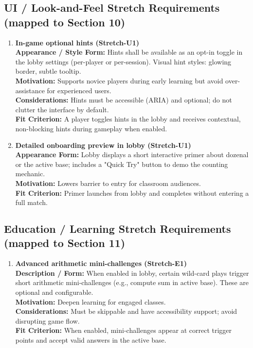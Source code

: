 \documentclass[12pt]{article}
\begin{document}
\subsection{UI / Look-and-Feel Stretch Requirements (mapped to Section 10)}
\begin{enumerate}
  \item \textbf{In-game optional hints (Stretch-U1)}\\
  \textbf{Appearance / Style Form:} Hints shall be available as an opt-in toggle in the lobby settings (per-player or per-session). Visual hint styles: glowing border, subtle tooltip.\\
  \textbf{Motivation:} Supports novice players during early learning but avoid over-assistance for experienced users.\\
  \textbf{Considerations:} Hints must be accessible (ARIA) and optional; do not clutter the interface by default.\\
  \textbf{Fit Criterion:} A player toggles hints in the lobby and receives contextual, non-blocking hints during gameplay when enabled.
  
  \item \textbf{Detailed onboarding preview in lobby (Stretch-U1)}\\
  \textbf{Appearance Form:} Lobby displays a short interactive primer about dozenal or the active base; includes a "Quick Try" button to demo the counting mechanic.\\
  \textbf{Motivation:} Lowers barrier to entry for classroom audiences.\\
  \textbf{Fit Criterion:} Primer launches from lobby and completes without entering a full match.
\end{enumerate}

\subsection{Education / Learning Stretch Requirements (mapped to Section 11)}
\begin{enumerate}
  \item \textbf{Advanced arithmetic mini-challenges (Stretch-E1)}\\
  \textbf{Description / Form:} When enabled in lobby, certain wild-card plays trigger short arithmetic mini-challenges (e.g., compute sum in active base). These are optional and configurable.\\
  \textbf{Motivation:} Deepen learning for engaged classes.\\
  \textbf{Considerations:} Must be skippable and have accessibility support; avoid disrupting game flow.\\
  \textbf{Fit Criterion:} When enabled, mini-challenges appear at correct trigger points and accept valid answers in the active base.
\end{enumerate}
\end{document}
